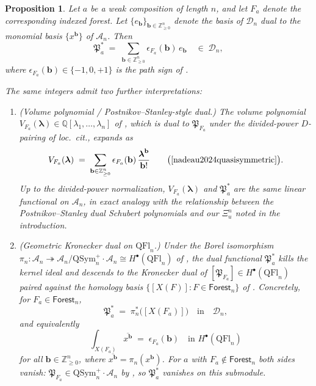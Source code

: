 \documentclass[a4paper,fleqn]{cas-sc}
\newtheorem{proposition}[lemma]{Proposition}
\theoremstyle{definition}
\theoremstyle{remark}
\numberwithin{equation}{subsection}
\newcommand{\dsch}{\ensuremath{\Xi}}
\newcommand{\coma}{\mathcal{A}}
\newcommand{\dcoma}{\mathcal{D}}
\newcommand{\forest}{\mathfrak{P}}
\begin{document}
\begin{proposition}\label{proposition:forestdualcoefficients}
Let $a$ be a weak composition of length $n$, and let $F_a$ denote the corresponding indexed forest. Let $\{e_{\mathbf{b}}\}_{\mathbf{b}\in \mathbb{Z}_{\geq 0}^n}$ denote the basis of $\dcoma_n$ dual to the monomial basis $\{x^{\mathbf{b}}\}$ of $\coma_n$. Then
$$\forest_a^* \;=\; \sum_{\mathbf{b}\in \mathbb{Z}_{\geq 0}^n} \epsilon_{F_a}(\mathbf{b})\,e_{\mathbf{b}}\quad\in\;\dcoma_n,$$
where $\epsilon_{F_a}(\mathbf{b})\in\{-1,0,+1\}$ is the path sign of \cite[Proposition~10.15]{nadeau2024quasisymmetric}.

The same integers admit two further interpretations:
\begin{enumerate}
\item (Volume polynomial / Postnikov--Stanley-style dual.) The volume polynomial $V_{F_a}(\boldsymbol\lambda)\in\mathbb{Q}[\lambda_1,\ldots,\lambda_n]$ of \cite[Section~10.5]{nadeau2024quasisymmetric}, which is dual to $\forest_{F_a}$ under the divided-power $D$-pairing of \emph{loc.~cit.}, expands as
$$V_{F_a}(\boldsymbol\lambda) \;=\; \sum_{\mathbf{b}\in\mathbb{Z}_{\geq 0}^n} \epsilon_{F_a}(\mathbf{b})\,\frac{\boldsymbol\lambda^{\mathbf{b}}}{\mathbf{b}!}\qquad\bigl(\text{\cite[Proposition~10.14]{nadeau2024quasisymmetric}}\bigr).$$
Up to the divided-power normalization, $V_{F_a}(\boldsymbol\lambda)$ and $\forest_a^*$ are the same linear functional on $\coma_n$, in exact analogy with the relationship between the Postnikov--Stanley dual Schubert polynomials \cite{postnikov2009chains} and our $\dsch_u^n$ noted in the introduction.

\item (Geometric Kronecker dual on $\mathrm{QFl}_n$.) Under the Borel isomorphism $\pi_n:\coma_n\twoheadrightarrow \coma_n/\mathrm{QSym}_n^+\cdot\coma_n \cong H^\bullet(\mathrm{QFl}_n)$ of \cite[Theorem~A and Corollary~12.5]{bergeron2025qsymflag}, the dual functional $\forest_a^*$ kills the kernel ideal and descends to the Kronecker dual of $[\forest_{F_a}]\in H^\bullet(\mathrm{QFl}_n)$ paired against the homology basis $\{[X(F)]:F\in\mathsf{Forest}_n\}$ of \cite[Corollary~11.6]{bergeron2025qsymflag}. Concretely, for $F_a\in\mathsf{Forest}_n$,
$$\forest_a^*\;=\;\pi_n^*\bigl([X(F_a)]\bigr) \quad\text{in}\quad \dcoma_n,$$
and equivalently
$$\int_{X(F_a)}\!\overline{x^{\mathbf{b}}} \;=\; \epsilon_{F_a}(\mathbf{b})\quad \text{in } H^\bullet(\mathrm{QFl}_n)$$
for all $\mathbf{b}\in\mathbb{Z}_{\geq 0}^n$, where $\overline{x^{\mathbf{b}}}=\pi_n(x^{\mathbf{b}})$. For $a$ with $F_a\not\in\mathsf{Forest}_n$ both sides vanish: $\forest_{F_a}\in \mathrm{QSym}_n^+\cdot\coma_n$ by \cite[Theorem~9.7]{nadeau2024quasisymmetric}, so $\forest_a^*$ vanishes on this submodule.
\end{enumerate}
\end{proposition}
\end{document}
